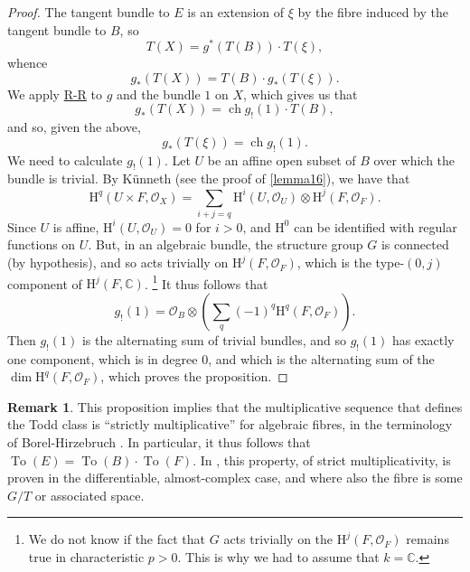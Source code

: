 \documentclass{article}
\theoremstyle{plain}
\theoremstyle{definition}
\newtheorem*{remark}{Remark}
\newcommand{\sh}[1]{{\mathscr{#1}}}
\newcommand{\HH}{\mathrm{H}}
\DeclareMathOperator{\ch}{ch}
\newcommand{\oldpage}[1]{\marginpar{\footnotesize$\Big\vert$ \textit{p.~#1}}}
\begin{document}
\begin{proof}
  The tangent bundle to $E$ is an extension of $\xi$ by the fibre induced by the tangent bundle to $B$, so
  \[
    T(X) = g^*(T(B))\cdot T(\xi),
  \]
  whence
  \[
    g_*(T(X)) = T(B)\cdot g_*(T(\xi)).
  \]
  We apply \hyperref[theoremriemannroch]{R-R} to $g$ and the bundle $1$ on $X$, which gives us that
  \[
    g_*(T(X)) = \ch g_!(1)\cdot T(B),
  \]
  and so, given the above,
  \[
    g_*(T(\xi)) = \ch g_!(1).
  \]
  We need to calculate $g_!(1)$.
  Let $U$ be an affine open subset of $B$ over which the bundle is trivial.
  By K\"{u}nneth (see the proof of \cref{lemma16}), we have that
  \[
    \HH^q(U\times F,\sh{O}_X)
    = \sum_{i+j=q} \HH^i(U,\sh{O}_U)\otimes\HH^j(F,\sh{O}_F).
  \]
  Since $U$ is affine, $\HH^i(U,\sh{O}_U)=0$ for $i>0$, and $\HH^0$ can be identified with regular functions on $U$.
  But, in an algebraic bundle, the structure group $G$ is connected (by hypothesis), and so acts trivially on $\HH^j(F,\sh{O}_F)$, which is the type-$(0,j)$ component of $\HH^j(F,\mathbb{C})$.
  \footnote{We do not know if the fact that $G$ acts trivially on the $\HH^j(F,\sh{O}_F)$ remains true in characteristic $p>0$. This is why we had to assume that $k=\mathbb{C}$.}
  It thus follows that
  \[
    g_!(1)
    = \sh{O}_B \otimes \left(
      \sum_q (-1)^q \HH^q(F,\sh{O}_F)
    \right).
  \]
  Then $g_!(1)$ is the alternating sum of trivial bundles, and so $g_!(1)$ has exactly one component, which is in degree $0$, and which is the alternating sum of the $\dim\HH^q(F,\sh{O}_F)$, which proves the proposition.
\end{proof}

\oldpage{136}
\begin{remark}
  This proposition implies that the multiplicative sequence that defines the Todd class is ``strictly multiplicative'' for algebraic fibres, in the terminology of Borel-Hirzebruch \cite{2}.
  In particular, it thus follows that $\operatorname{To}(E)=\operatorname{To}(B)\cdot\operatorname{To}(F)$.
  In \cite{2}, this property, of strict multiplicativity, is proven in the differentiable, almost-complex case, and where also the fibre is some $G/T$ or associated space.
\end{remark}



\nocite{*}
\end{document}
